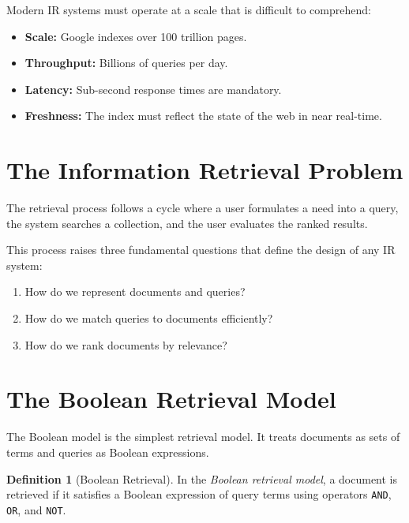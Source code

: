 \documentclass[11pt,a4paper]{article}
\theoremstyle{definition}
\newtheorem{definition}{Definition}[section]
\theoremstyle{plain}
\begin{document}
Modern IR systems must operate at a scale that is difficult to comprehend:
\begin{itemize}
    \item \textbf{Scale:} Google indexes over 100 trillion pages.
    \item \textbf{Throughput:} Billions of queries per day.
    \item \textbf{Latency:} Sub-second response times are mandatory.
    \item \textbf{Freshness:} The index must reflect the state of the web in near real-time.
\end{itemize}

\section{The Information Retrieval Problem}
\label{sec:ir-problem}

The retrieval process follows a cycle where a user formulates a need into a query, the system searches a collection, and the user evaluates the ranked results.

\begin{center}

\end{center}

This process raises three fundamental questions that define the design of any IR system:
\begin{enumerate}
    \item How do we represent documents and queries?
    \item How do we match queries to documents efficiently?
    \item How do we rank documents by relevance?
\end{enumerate}

\section{The Boolean Retrieval Model}
\label{sec:boolean}

The Boolean model is the simplest retrieval model. It treats documents as sets of terms and queries as Boolean expressions.

\begin{definition}[Boolean Retrieval]
In the \emph{Boolean retrieval model}, a document is retrieved if it satisfies a Boolean expression of query terms using operators \texttt{AND}, \texttt{OR}, and \texttt{NOT}.
\end{definition}
\end{document}
